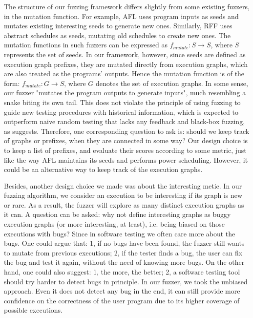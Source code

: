 The structure of our fuzzing framework differs slightly from some existing fuzzers, in the mutation function. For example, AFL uses program inputs as seeds and mutates existing interesting seeds to generate new ones. Similarly, RFF uses abstract schedules as seeds, mutating old schedules to create new ones. The mutation functions in such fuzzers can be expressed as $f_{mutate}: S \to S$, where $S$ represents the set of seeds.  In our framework, however, since seeds are defined as execution graph prefixes, they are mutated directly from execution graphs, which are also treated as the programs' outputs. Hence the mutation function is of the form: $f_{mutate}: G \to S$, where $G$ denotes the set of execution graphs. In some sense, our fuzzer "mutates the program outputs to generate inputs", much resembling a snake biting its own tail. This does not violate the principle of using fuzzing to guide new testing procedures with historical information, which is expected to outperform naive random testing that lacks any feedback and black-box fuzzing, as \cite{sage} suggests. Therefore, one corresponding question to ask is: should we keep track of graphs or prefixes, when they are connected in some way? Our design choice is to keep a list of prefixes, and evaluate their scores according to some metric, just like the way AFL maintains its seeds and performs power scheduling. However, it could be an alternative way to keep track of the execution graphs.

Besides, another design choice we made was about the interesting metic. In our fuzzing algorithm, we consider an execution to be interesting if its graph is new or rare. As a result, the fuzzer will explore as many distinct execution graphs as it can. A question can be asked: why not define interesting graphs as buggy execution graphs (or more interesting, at least), i.e. being biased on those executions with bugs? Since in software testing we often care more about the bugs. One could argue that: 1, if no bugs have been found, the fuzzer still wants to mutate from previous executions; 2, if the tester finds a bug, the user can fix the bug and test it again, without the need of knowing more bugs. On the other hand, one could also suggest: 1, the more, the better; 2, a software testing tool should try harder to detect bugs in principle. In our fuzzer, we took the unbiased approach. Even it does not detect any bug in the end, it can still provide more confidence on the correctness of the user program due to its higher coverage of possible executions.

